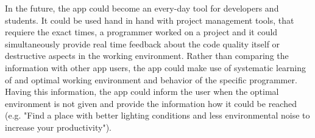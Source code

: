 \begin{flushleft}
In the future, the app could become an every-day tool for developers and students. It could be used hand in hand with project management tools, that requiere the exact times, a programmer worked on a project and it could simultaneously provide real time feedback about the code quality itself or destructive aspects in the working environment. Rather than comparing the information with other app users, the app could make use of systematic learning of and optimal working environment and behavior of the specific programmer. Having this information, the app could inform the user when the optimal environment is not given and provide the information how it could be reached (e.g. "Find a place with better lighting conditions and less environmental noise to increase your productivity"). 

\end{flushleft}

